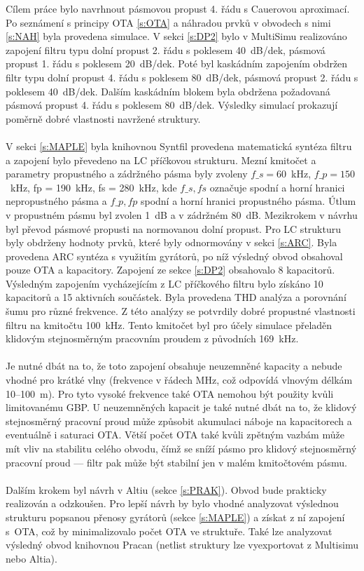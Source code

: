 \noindent Cílem práce bylo navrhnout pásmovou propust 4. řádu s Cauerovou aproximací. Po seznámení s principy OTA \ref{s:OTA} a náhradou prvků v obvodech s nimi \ref{s:NAH} byla provedena simulace. V sekci \ref{s:DP2} bylo v MultiSimu realizováno zapojení filtru typu dolní propust 2. řádu s poklesem 40~dB/dek, pásmová propust 1. řádu s poklesem 20~dB/\mbox{dek}. Poté byl kaskádním zapojením obdržen filtr typu dolní propust 4. řádu s poklesem 80~dB/dek, pásmová propust 2. řádu s poklesem 40~dB/dek. Dalším kaskádním blokem byla obdržena požadovaná pásmová propust 4. řádu s poklesem 80~dB/dek. Výsledky simulací prokazují poměrně dobré vlastnosti navržené struktury.\\
\\
V sekci \ref{s:MAPLE} byla knihovnou Syntfil provedena matematická syntéza filtru a zapojení bylo převedeno na LC příčkovou strukturu. Mezní kmitočet a parametry propustného a zádržného pásma byly zvoleny $f\_s = 60$~kHz, $f\_p = 150$~kHz, fp = 190~kHz, fs = 280~kHz, kde $f\_s, fs$ označuje spodní a horní hranici nepropustného pásma a $f\_p, fp$ spodní a horní hranici propustného pásma. Útlum v propustném pásmu byl zvolen 1~dB a v zádržném 80~dB. Mezikrokem v návrhu byl převod pásmové propusti na normovanou dolní propust. Pro LC strukturu byly obdrženy hodnoty prvků, které byly odnormovány v sekci \ref{s:ARC}. Byla provedena ARC syntéza s využitím gyrátorů, po níž výsledný obvod obsahoval pouze OTA a kapacitory. Zapojení ze sekce \ref{s:DP2} obsahovalo 8 kapacitorů. Výsledným zapojením vycházejícím z LC příčkového filtru bylo získáno 10 kapacitorů a 15 aktivních součástek. Byla provedena THD analýza a porovnání šumu pro různé frekvence. Z této analýzy se potvrdily dobré propustné vlastnosti filtru na kmitočtu 100~kHz. Tento kmitočet byl pro účely simulace přeladěn klidovým stejnosměrným pracovním proudem z původních 169~kHz. \\
\\
Je nutné dbát na to, že toto zapojení obsahuje neuzemněné kapacity a nebude vhodné pro krátké vlny (frekvence v řádech MHz, což odpovídá vlnovým délkám 10--100~m). Pro tyto vysoké frekvence také OTA nemohou být použity kvůli limitovanému GBP. U neuzemněných kapacit je také nutné dbát na to, že klidový stejnosměrný pracovní proud může způsobit akumulaci náboje na kapacitorech a eventuálně i saturaci OTA. Větší počet OTA také kvůli zpětným vazbám může mít vliv na stabilitu celého obvodu, čímž se sníží pásmo pro klidový stejnosměrný pracovní proud --- filtr pak může být stabilní jen v malém kmitočtovém pásmu.\\
\\
Dalším krokem byl návrh v Altiu (sekce \ref{s:PRAK}). Obvod bude prakticky realizován a odzkoušen. Pro lepší návrh by bylo vhodné analyzovat výslednou strukturu popsanou přenosy gyrátorů (sekce \ref{s:MAPLE}) a získat z ní zapojení s~OTA, což by minimalizovalo počet OTA ve struktuře. Také lze analyzovat výsledný obvod knihovnou Pracan (netlist struktury lze vyexportovat z Multisimu nebo Altia).